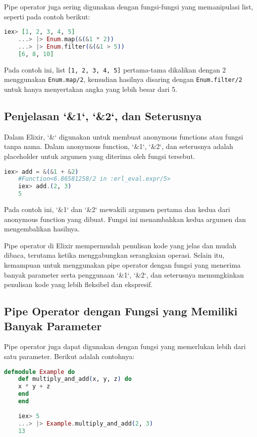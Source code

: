 Pipe operator juga sering digunakan dengan fungsi-fungsi yang memanipulasi list, seperti pada contoh berikut:

\begin{lstlisting}[language=Elixir]
	iex> [1, 2, 3, 4, 5]
	...> |> Enum.map(&(&1 * 2))
	...> |> Enum.filter(&(&1 > 5))
	[6, 8, 10]
\end{lstlisting}

Pada contoh ini, list \texttt{[1, 2, 3, 4, 5]} pertama-tama dikalikan dengan 2 menggunakan \texttt{Enum.map/2}, kemudian hasilnya disaring dengan \texttt{Enum.filter/2} untuk hanya menyertakan angka yang lebih besar dari 5.

\subsection{Penjelasan `\&1`, `\&2`, dan Seterusnya}

Dalam Elixir, `\&` digunakan untuk membuat anonymous functions atau fungsi tanpa nama. Dalam anonymous function, `\&1`, `\&2`, dan seterusnya adalah placeholder untuk argumen yang diterima oleh fungsi tersebut.

\begin{lstlisting}[language=Elixir]
	iex> add = &(&1 + &2)
	#Function<6.86581258/2 in :erl_eval.expr/5>
	iex> add.(2, 3)
	5
\end{lstlisting}

Pada contoh ini, `\&1` dan `\&2` mewakili argumen pertama dan kedua dari anonymous function yang dibuat. Fungsi ini menambahkan kedua argumen dan mengembalikan hasilnya.

Pipe operator di Elixir mempermudah penulisan kode yang jelas dan mudah dibaca, terutama ketika menggabungkan serangkaian operasi. Selain itu, kemampuan untuk menggunakan pipe operator dengan fungsi yang menerima banyak parameter serta penggunaan `\&1`, `\&2`, dan seterusnya memungkinkan penulisan kode yang lebih fleksibel dan ekspresif.

\subsection{Pipe Operator dengan Fungsi yang Memiliki Banyak Parameter}

Pipe operator juga dapat digunakan dengan fungsi yang memerlukan lebih dari satu parameter. Berikut adalah contohnya:

\begin{lstlisting}[language=Elixir]
	defmodule Example do
	def multiply_and_add(x, y, z) do
	x * y + z
	end
	end
	
	iex> 5
	...> |> Example.multiply_and_add(2, 3)
	13
\end{lstlisting}

